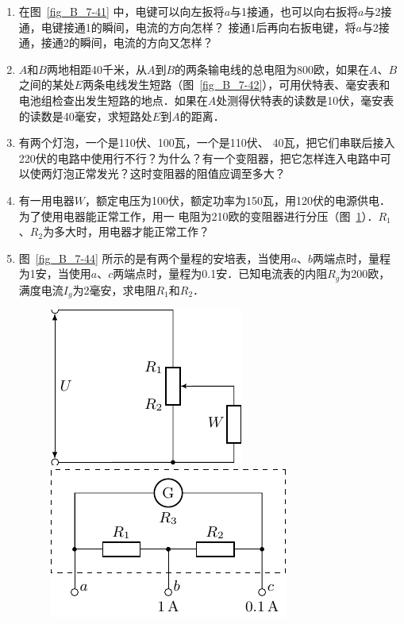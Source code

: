 \begin{enumerate}
    \item 在图~\ref{fig_B_7-41} 中，电键可以向左扳将$a$与1接通，也可以向右扳将$a$与2接通，电键接通1的瞬间，电流的方向怎样？
接通1后再向右扳电键，将$a$与2接通，接通2的瞬间，电流的方向又怎样？
\item $A$和$B$两地相距40千米，从$A$到$B$的两条输电线的总电阻为800欧，如果在$A$、$B$之间的某处$E$两条电线发生短路（图~\ref{fig_B_7-42}），可用伏特表、毫安表和电池组检查出发生短路的地点．如果在$A$处测得伏特表的读数是10伏，毫安表的读数是40毫安，求短路处$E$到$A$的距离．
\item 有两个灯泡，一个是110伏、100瓦，一个是110伏、
40瓦，把它们串联后接入220伏的电路中使用行不行？为什么？有一个变阻器，把它怎样连入电路中可以使两灯泡正常发光？这时变阻器的阻值应调至多大？
\item 有一用电器$W$，额定电压为100伏，额定功率为150瓦，用120伏的电源供电．为了使用电器能正常工作，用一
电阻为210欧的变阻器进行分压（图~\ref{fig_B_7-43}）．$R_1$、$R_2$为多大时，用电器才能正常工作？
\item 图~\ref{fig_B_7-44} 所示的是有两个量程的安培表，当使用$a$、$b$两端点时，量程为1安，当使用$a$、$c$两端点时，量程为0.1安．已知电流表的内阻$R_g$为200欧，满度电流$I_g$为2毫安，求电阻$R_1$和$R_2$．
\begin{figure}[htbp]
    \centering
    \begin{minipage}[t]{0.48\textwidth}
        \centering
        \includegraphics{fig/B/7-43.pdf}
        \caption{}\label{fig_B_7-43}
    \end{minipage}
    \begin{minipage}[t]{0.48\textwidth}
        \centering
        \includegraphics{fig/B/7-44.pdf}

\end{minipage}
\end{figure}
\end{enumerate}
